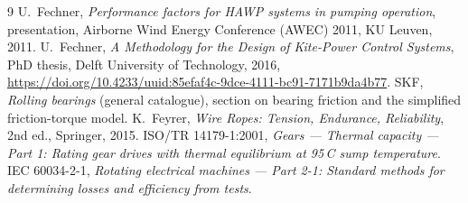 \documentclass[11pt,a4paper]{article}
\begin{document}
\begin{thebibliography}{9}
U.~Fechner, \emph{Performance factors for HAWP systems in pumping operation},
presentation, Airborne Wind Energy Conference (AWEC) 2011, KU Leuven, 2011.
U.~Fechner, \emph{A Methodology for the Design of Kite-Power Control Systems},
PhD thesis, Delft University of Technology, 2016,
\url{https://doi.org/10.4233/uuid:85efaf4c-9dce-4111-bc91-7171b9da4b77}.
SKF, \emph{Rolling bearings} (general catalogue), section on bearing friction
and the simplified friction-torque model.
K.~Feyrer, \emph{Wire Ropes: Tension, Endurance, Reliability}, 2nd ed.,
Springer, 2015.
ISO/TR 14179-1:2001, \emph{Gears --- Thermal capacity --- Part 1: Rating gear
drives with thermal equilibrium at 95\,\textdegree C sump temperature}.
IEC 60034-2-1, \emph{Rotating electrical machines --- Part 2-1: Standard
methods for determining losses and efficiency from tests}.
\end{thebibliography}
\end{document}
